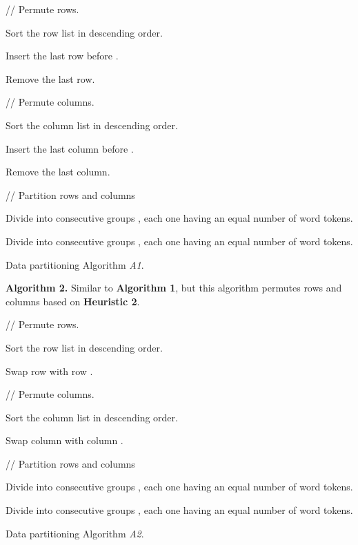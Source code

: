 \documentclass[10pt,conference]{IEEEtran}
\begin{document}
\begin{algorithm} [h]


\nonl// Permute rows.

Sort the row list  in descending order.

 {
	 {
		Insert the last row  before .
		
		Remove the last row.
	}
}
	
\nonl// Permute columns.

Sort the column list  in descending order.

 {
	 {
		Insert the last column  before .
		
		Remove the last column.
	}
}

\nonl// Partition rows and columns

Divide  into  consecutive groups , each one having an equal number of word tokens.

Divide  into  consecutive groups , each one having an equal number of word tokens.

\caption{Data partitioning Algorithm \textit{A1}.}	
\label{A1}
\end{algorithm}

\textbf{Algorithm 2.} Similar to \textbf{Algorithm 1}, but this algorithm permutes rows and columns based on \textbf{Heuristic 2}.

\begin{algorithm} [h]


\nonl// Permute rows.

Sort the row list  in descending order.

 {
	 {
		Swap row  with row .
	}
}
	
\nonl// Permute columns.

Sort the column list  in descending order.

 {
	 {
		Swap column  with column .
	}
}

\nonl// Partition rows and columns

Divide  into  consecutive groups , each one having an equal number of word tokens.

Divide  into  consecutive groups , each one having an equal number of word tokens.

\caption{Data partitioning Algorithm \textit{A2}.}
\label{A2}
\end{algorithm}
\end{document}
